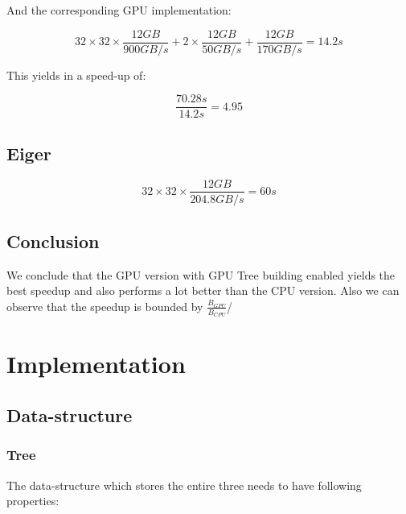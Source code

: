 \documentclass[]{article}
\begin{document}
And the corresponding GPU implementation:
\begin{center}
	\begin{equation}
		32 \times 32 \times \frac{12 GB}{900 GB/s} + 2 \times \frac{12 GB}{50 GB/s}  + \frac{12 GB}{170 GB/s} = 14.2s
	\end{equation}
\end{center}

This yields in a speed-up of:
\begin{center}
	\begin{equation}
		\frac{70.28s}{14.2s} = 4.95
	\end{equation}
\end{center}


\vspace{5mm}


\subsection{Eiger}

\begin{center}
	\begin{equation}
		32 \times 32 \times \frac{ 12 GB }{204.8 GB/s} = 60s
	\end{equation}
\end{center}

\subsection{Conclusion}

We conclude that the GPU version with GPU Tree building enabled yields the best speedup and also performs a lot better than the CPU version. Also we can observe that the speedup is bounded by $\frac{B_{GPU}}{B_{CPU}}$/ 

\section{Implementation}

\subsection{Data-structure}

\subsubsection{Tree}

The data-structure which stores the entire three needs to have following properties:
\end{document}

